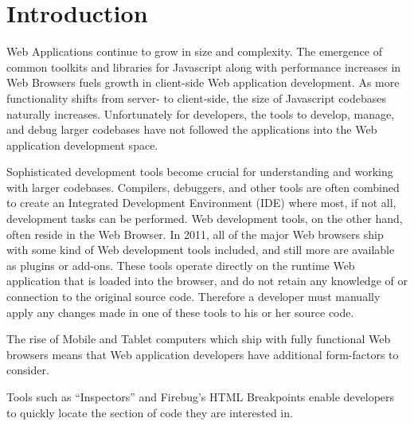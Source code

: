
\section{Introduction}
Web Applications continue to grow in size and complexity. The
emergence of common toolkits and libraries for Javascript along with performance
increases in Web Browsers fuels growth in client-side Web application
development. As more functionality shifts from server- to client-side, the size
of Javascript codebases naturally increases. Unfortunately for developers, the
tools to develop, manage, and debug larger codebases have not followed the
applications into the Web application development space.

Sophisticated development tools become crucial for understanding
and working with larger codebases. Compilers, debuggers, and other tools are
often combined to create an Integrated Development Environment (IDE) where
most, if not all, development tasks can be performed. Web development tools, on
the other hand, often reside in the Web Browser. In 2011, all of the major Web
browsers ship with some kind of Web development tools included\cite{something},
and still more are available as plugins or add-ons. These tools operate
directly on the runtime Web application that is loaded into the browser, and do
not retain any knowledge of or connection to the original source code. Therefore
a developer must manually apply any changes made in one of these tools to his or
her source code.

The rise of Mobile and Tablet computers which ship with fully functional Web
browsers means that Web application developers have additional form-factors to
consider.

Tools such as ``Inspectors'' and Firebug's HTML Breakpoints\cite{jjb-www2010}
enable developers to quickly locate the section of code they are interested in.
